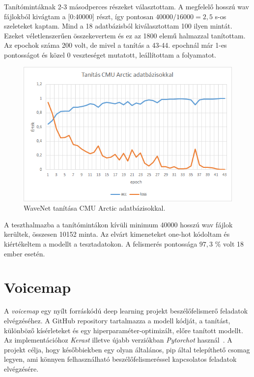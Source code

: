 \newline
\newline
Tanítómintáknak 2-3 másodperces részeket választottam. A megfelelő hosszú wav fájlokból kivágtam a [0:40000] részt, így pontosan $40000/16000 = 2,5$ s-os szeleteket kaptam. Mind a 18 adatbázisból kiválasztottam 100 ilyen mintát. Ezeket véletlenszerűen összekevertem és ez az 1800 elemű halmazzal tanítottam. Az epochok száma 200 volt, de mivel a tanítás a 43-44. epochnál már 1-es pontosságot és közel 0 veszteséget mutatott, leállítottam a folyamatot. 
\newline
\newline
\begin{figure}[!ht]
	\centering
	\includegraphics[width=150mm, keepaspectratio]{figures/wavenet-train-cmu-arctic.png}
	\caption{WaveNet tanítása CMU Arctic adatbázisokkal.}
	\label{fig:wavenet-train-cmu-arctic}
\end{figure}
A teszthalmazba a tanítómintákon kívüli minimum 40000 hosszú wav fájlok kerültek, összesen 10152 minta.
Az elvárt kimeneteket one-hot kódoltam és kiértékeltem a modellt a tesztadatokon. A felismerés pontossága $97,3$ \% volt 18 ember esetén.

\section{Voicemap}

A \emph{voicemap} egy nyílt forráskódú deep learning projekt beszélőfelismerő feladatok elvégzéséhez. A GitHub repository tartalmazza a modell kódját, a tanítást, különböző kísérleteket és egy hiperparaméter-optimizált, előre tanított modellt. Az implementációhoz \emph{Kerast} illetve újabb verziókban \emph{Pytorchot} használ~\cite{voicemap_github}.
\newline
\newline
A projekt célja, hogy későbbiekben egy olyan általános, pip által telepíthető csomag legyen, ami könnyen felhasználható beszélőfelismeréssel kapcsolatos feladatok elvégzésére.


